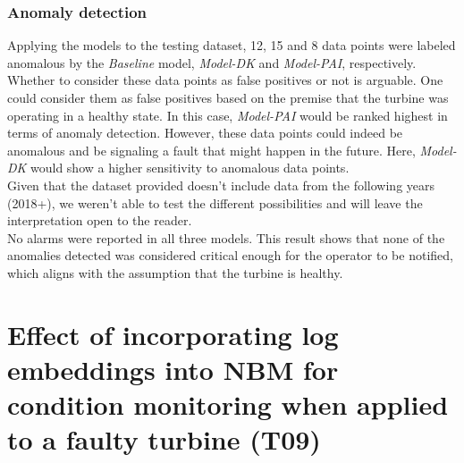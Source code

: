\subsubsection{Anomaly detection}
Applying the models to the testing dataset, 12, 15 and 8 data points were labeled anomalous by the \emph{Baseline} model,
\emph{Model-DK} and \emph{Model-PAI}, respectively. Whether to consider these data points as false positives or not is 
arguable. One could consider them as false positives based on the premise that the turbine was operating in a healthy state.
In this case, \emph{Model-PAI} would be ranked highest in terms of anomaly detection. However, these data points could indeed
be anomalous and be signaling a fault that might happen in the future. Here, \emph{Model-DK} would show a higher sensitivity 
to anomalous data points. \\
Given that the dataset provided doesn't include data from the following years (2018+), 
we weren't able to test the different possibilities and will leave the interpretation open to the reader.\\

No alarms were reported in all three models. This result shows that none of the anomalies detected was considered 
critical enough for the operator to be notified, which aligns with the assumption that the turbine is healthy.





\section{Effect of incorporating log embeddings into NBM for condition monitoring when applied to a faulty turbine (T09)}
